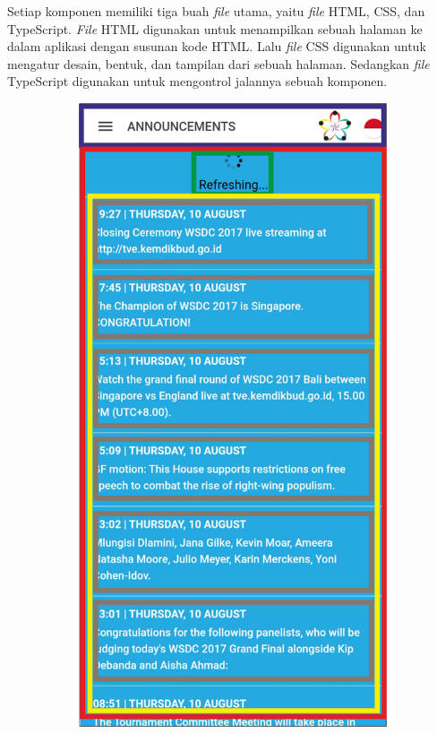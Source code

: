 Setiap komponen memiliki tiga buah \textit{file} utama, yaitu \textit{file} HTML, CSS, dan TypeScript. \textit{File} HTML digunakan untuk menampilkan sebuah halaman ke dalam aplikasi dengan susunan kode HTML. Lalu \textit{file} CSS digunakan untuk mengatur desain, bentuk, dan tampilan dari sebuah halaman. Sedangkan \textit{file} TypeScript digunakan untuk mengontrol jalannya sebuah komponen.

\begin{figure}[H]
     \centering
     \begin{subfigure}[b]{0.247\textwidth}
        \centering
	    \includegraphics[scale=0.37]{Gambar/AnnouncementsPageWireframe.png}

\end{subfigure}
\end{figure}
